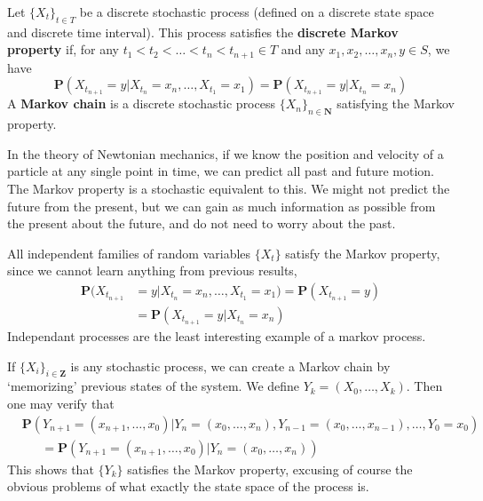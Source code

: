 \begin{definition}
    Let $\{ X_t \}_{t \in T}$ be a discrete stochastic process (defined on a discrete state space and discrete time interval). This process satisfies the {\bf discrete Markov property} if, for any $t_1 < t_2 < \dots < t_n < t_{n+1} \in T$ and any $x_1, x_2, \dots, x_n, y \in S$, we have
    \[ \mathbf{P}(X_{t_{n+1}} = y | X_{t_n} = x_n, \dots, X_{t_1} = x_1) = \mathbf{P}(X_{t_{n+1}} = y | X_{t_n} = x_{n}) \]
    A {\bf Markov chain} is a discrete stochastic process $\{ X_n \}_{n \in \mathbf{N}}$ satisfying the Markov property.
\end{definition}

In the theory of Newtonian mechanics, if we know the position and velocity of a particle at any single point in time, we can predict all past and future motion. The Markov property is a stochastic equivalent to this. We might not predict the future from the present, but we can gain as much information as possible from the present about the future, and do not need to worry about the past.

\begin{example}
    All independent families of random variables $\{ X_t \}$ satisfy the Markov property, since we cannot learn anything from previous results,
    \begin{align*}
        \mathbf{P}(X_{t_{n+1}} &= y | X_{t_n} = x_n, \dots, X_{t_1} = x_1) = \mathbf{P}(X_{t_{n+1}} = y)\\
        &= \mathbf{P}(X_{t_{n+1}} = y | X_{t_n} = x_n)
    \end{align*}
    Independant processes are the least interesting example of a markov process.
\end{example}

\begin{example}
    If $\{X_i\}_{i \in \mathbf{Z}}$ is any stochastic process, we can create a Markov chain by `memorizing' previous states of the system. We define $Y_k = (X_0, \dots, X_k)$. Then one may verify that
    \begin{align*} &\mathbf{P}(Y_{n+1} = (x_{n+1}, \dots, x_0) | Y_n = (x_0, \dots, x_n), Y_{n-1} = (x_0, \dots, x_{n-1}), \dots, Y_0 = x_0)\\
    &\ \ \ \ \ \ \ = \mathbf{P}(Y_{n+1} = (x_{n+1}, \dots, x_0) | Y_n = (x_0, \dots, x_n)) \end{align*}
    This shows that $\{ Y_k \}$ satisfies the Markov property, excusing of course the obvious problems of what exactly the state space of the process is.
\end{example}

